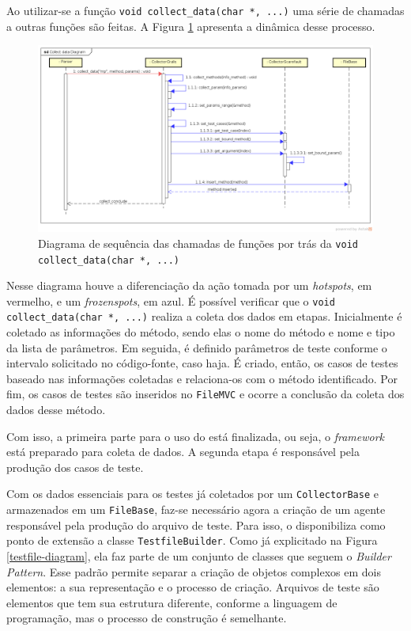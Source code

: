 Ao utilizar-se a função \lstinline|void collect_data(char *, ...)| uma série
de chamadas a outras funções são feitas. A Figura \ref{collect-data-sequence-diagram}
apresenta a dinâmica desse processo.
\begin{landscape}
\begin{figure}[h]
  \centering
    \includegraphics[width=1.5\textwidth]{figuras/collect-data-sequence-diagram.png}
    \caption{Diagrama de sequência das chamadas de funções por trás da \lstinline|void collect_data(char *, ...)|}
    \label{collect-data-sequence-diagram}
\end{figure}
\FloatBarrier
\end{landscape}

Nesse diagrama houve a diferenciação da ação tomada por um \textit{hotspots}, em vermelho, e um \textit{frozenspots}, em azul. É possível verificar que o \lstinline|void collect_data(char *, ...)| realiza a coleta dos dados em etapas. Inicialmente é coletado as informações do método, sendo elas o nome do método e nome e tipo da lista de parâmetros. Em seguida, é definido parâmetros de teste conforme o intervalo solicitado no código-fonte, caso haja. É criado, então, os casos de testes baseado nas informações coletadas e relaciona-os com o método identificado. Por fim, os casos de testes são inseridos no \lstinline|FileMVC| e ocorre a conclusão da coleta dos dados desse método.

Com isso, a primeira parte para o uso do \scarefault está finalizada, ou seja, o \textit{framework} está preparado para coleta de dados. A segunda etapa é responsável pela produção dos casos de teste.

Com os dados essenciais para os testes já coletados por um
\lstinline|CollectorBase| e armazenados em um \lstinline|FileBase|,
faz-se necessário agora a criação de um agente responsável pela
produção do arquivo de teste. Para isso, o \framework disponibiliza como
ponto de extensão a classe \lstinline|TestfileBuilder|. Como já explicitado
na Figura \ref{testfile-diagram}, ela faz parte de um conjunto de classes
que seguem o \textit{Builder Pattern}. Esse padrão permite separar a criação
de objetos complexos em dois elementos: a sua representação e o processo de
criação. Arquivos de teste são elementos que tem sua estrutura diferente, conforme
a linguagem de programação, mas o processo de construção é semelhante.

